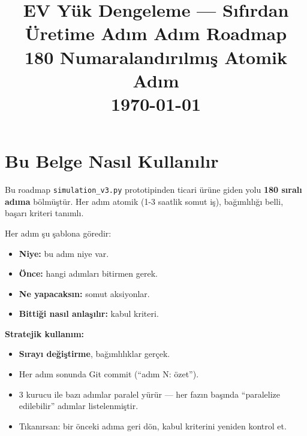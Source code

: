 \documentclass[11pt,a4paper]{article}
\title{\textbf{EV Yük Dengeleme — Sıfırdan Üretime Adım Adım Roadmap}\\
       \large 180 Numaralandırılmış Atomik Adım\\
       \normalsize \today}
\author{}
\date{}
\begin{document}
\maketitle
\tableofcontents
\newpage

\section{Bu Belge Nasıl Kullanılır}

Bu roadmap \texttt{simulation\_v3.py} prototipinden ticari ürüne giden yolu \textbf{180 sıralı adıma} bölmüştür. Her adım atomik (1-3 saatlik somut iş), bağımlılığı belli, başarı kriteri tanımlı.

Her adım şu şablona göredir:
\begin{itemize}
    \item \textbf{Niye:} bu adım niye var.
    \item \textbf{Önce:} hangi adımları bitirmen gerek.
    \item \textbf{Ne yapacaksın:} somut aksiyonlar.
    \item \textbf{Bittiği nasıl anlaşılır:} kabul kriteri.
\end{itemize}

\textbf{Stratejik kullanım:}
\begin{itemize}
    \item \textbf{Sırayı değiştirme}, bağımlılıklar gerçek.
    \item Her adım sonunda Git commit (``adım N: özet'').
    \item 3 kurucu ile bazı adımlar paralel yürür --- her fazın başında ``paralelize edilebilir'' adımlar listelenmiştir.
    \item Tıkanırsan: bir önceki adıma geri dön, kabul kriterini yeniden kontrol et.
\end{itemize}
\end{document}
